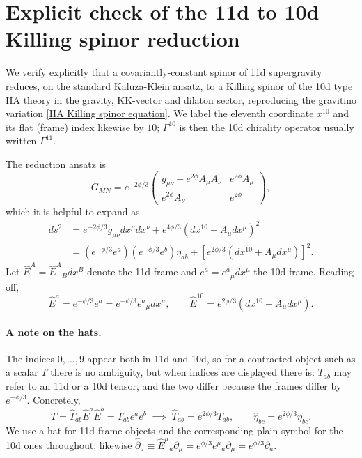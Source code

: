 \section{Explicit check of the 11d to 10d Killing spinor reduction}
\label{sec:IIA killing spinor reduction}
We verify explicitly that a covariantly-constant spinor of 11d supergravity reduces, on the standard Kaluza-Klein ansatz, to a Killing spinor of the 10d type IIA theory in the gravity, KK-vector and dilaton sector, reproducing the gravitino variation \eqref{IIA Killing spinor equation}.
We label the eleventh coordinate $x^{10}$ and its flat (frame) index likewise by $10$; $\Gamma^{10}$ is then the 10d chirality operator usually written $\Gamma^{11}$.

The reduction ansatz is
\begin{equation}
G_{MN}
=e^{-2\phi/3}
\begin{pmatrix}
    g_{\mu\nu}+e^{2\phi} A_\mu A_\nu & e^{2\phi}A_\mu \\
    e^{2\phi} A_\nu  & e^{2\phi}
\end{pmatrix},
\end{equation}
which it is helpful to expand as
\begin{align}
ds^2
&= e^{-2\phi/3}
g_{\mu\nu} dx^\mu dx^\nu
+e^{4\phi /3}(dx^{10} + A_\mu dx^\mu)^2\\
&= (e^{-\phi/3}e^a)(e^{-\phi/3} e^b)\eta_{ab}+[e^{2\phi/3}(dx^{10}+A_\mu dx^\mu)]^2 .
\end{align}
Let $\hat E^A=\hat E^A{}_B dx^B$ denote the 11d frame and $e^a=e^a{}_\mu dx^\mu$ the 10d frame. Reading off,
\begin{equation}
\hat E^a = e^{-\phi/3}e^a = e^{-\phi/3}e^a{}_\mu  dx^\mu,\qquad
\hat E^{10}=e^{2\phi/3}(dx^{10}+A_\mu dx^\mu).
\end{equation}

\paragraph{A note on the hats.}
The indices $0,\dots,9$ appear both in 11d and 10d, so for a contracted object such as a scalar $T$ there is no ambiguity, but when indices are displayed there is: $T_{ab}$ may refer to an 11d or a 10d tensor, and the two differ because the frames differ by $e^{-\phi/3}$. Concretely,
\begin{equation}
T =\hat T_{ab} \hat E^a \hat E^b=T_{ab} e^a e^b
\;\implies\;
\hat T_{ab}=e^{2\phi/3}T_{ab},\qquad \hat \eta_{bc} = e^{2\phi/3}\eta_{bc}.
\end{equation}
We use a hat for 11d frame objects and the corresponding plain symbol for the 10d ones throughout; likewise $\hat\partial_a\equiv \hat E^\mu{}_a\partial_\mu=e^{\phi/3}e^\mu{}_a\partial_\mu=e^{\phi/3}\partial_a$.

